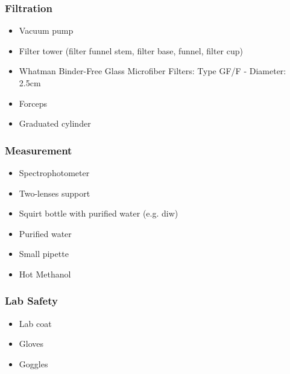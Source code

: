 \begin{appendices}
\subsubsection*{Filtration}
\begin{itemize}[itemsep=2pt,parsep=2pt]
  \item Vacuum pump
  \item Filter tower (filter funnel stem, filter base, funnel, filter cup)
  \item Whatman Binder-Free Glass Microfiber Filters: Type GF/F - Diameter: 2.5cm
  \item Forceps
  \item Graduated cylinder
\end{itemize}
\subsubsection*{Measurement}
\begin{itemize}[itemsep=2pt,parsep=2pt]
  \item Spectrophotometer
  \item Two-lenses support
  \item Squirt bottle with purified water (e.g. \gls{diw})
  \item Purified water
  \item Small pipette 
  \item Hot Methanol
\end{itemize}
\subsubsection*{Lab Safety}
\begin{itemize}[itemsep=2pt,parsep=2pt]
  \item Lab coat
  \item Gloves
  \item Goggles
\end{itemize}

\end{appendices}
